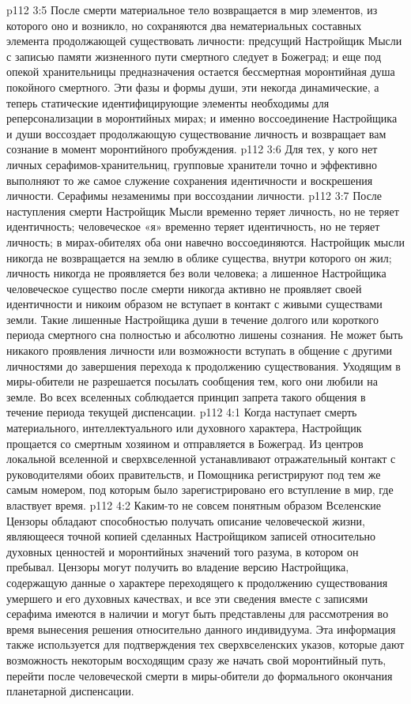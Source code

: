 \vs p112 3:5 \pc После смерти материальное тело возвращается в мир элементов, из которого оно и возникло, но сохраняются два нематериальных составных элемента продолжающей существовать личности: предсущий Настройщик Мысли с записью памяти жизненного пути смертного следует в Божеград; и еще под опекой хранительницы предназначения остается бессмертная моронтийная душа покойного смертного. Эти фазы и формы души, эти некогда динамические, а теперь статические идентифицирующие элементы необходимы для реперсонализации в моронтийных мирах; и именно воссоединение Настройщика и души воссоздает продолжающую существование личность и возвращает вам сознание в момент моронтийного пробуждения.
\vs p112 3:6 Для тех, у кого нет личных серафимов\hyp{}хранительниц, групповые хранители точно и эффективно выполняют то же самое служение сохранения идентичности и воскрешения личности. Серафимы незаменимы при воссоздании личности.
\vs p112 3:7 После наступления смерти Настройщик Мысли временно теряет личность, но не теряет идентичность; человеческое «я» временно теряет идентичность, но не теряет личность; в мирах\hyp{}обителях оба они навечно воссоединяются. Настройщик мысли никогда не возвращается на землю в облике существа, внутри которого он жил; личность никогда не проявляется без воли человека; а лишенное Настройщика человеческое существо после смерти никогда активно не проявляет своей идентичности и никоим образом не вступает в контакт с живыми существами земли. Такие лишенные Настройщика души в течение долгого или короткого периода смертного сна полностью и абсолютно лишены сознания. Не может быть никакого проявления личности или возможности вступать в общение с другими личностями до завершения перехода к продолжению существования. Уходящим в миры\hyp{}обители не разрешается посылать сообщения тем, кого они любили на земле. Во всех вселенных соблюдается принцип запрета такого общения в течение периода текущей диспенсации.
\vs p112 4:1 Когда наступает смерть материального, интеллектуального или духовного характера, Настройщик прощается со смертным хозяином и отправляется в Божеград. Из центров локальной вселенной и сверхвселенной устанавливают отражательный контакт с руководителями обоих правительств, и Помощника регистрируют под тем же самым номером, под которым было зарегистрировано его вступление в мир, где властвует время.
\vs p112 4:2 Каким\hyp{}то не совсем понятным образом Вселенские Цензоры обладают способностью получать описание человеческой жизни, являющееся точной копией сделанных Настройщиком записей относительно духовных ценностей и моронтийных значений того разума, в котором он пребывал. Цензоры могут получить во владение версию Настройщика, содержащую данные о характере переходящего к продолжению существования умершего и его духовных качествах, и все эти сведения вместе с записями серафима имеются в наличии и могут быть представлены для рассмотрения во время вынесения решения относительно данного индивидуума. Эта информация также используется для подтверждения тех сверхвселенских указов, которые дают возможность некоторым восходящим сразу же начать свой моронтийный путь, перейти после человеческой смерти в миры\hyp{}обители до формального окончания планетарной диспенсации.

